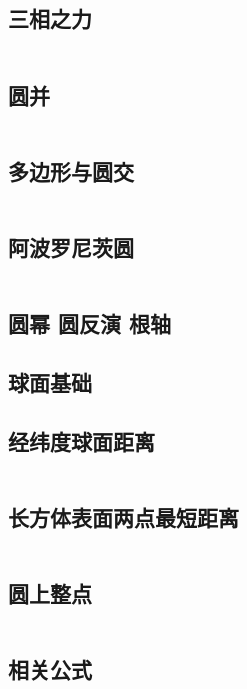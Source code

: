 \documentclass[titlepage, a4paper]{article}
\begin{document}
\begin{multicols}{2}
\begin{spacing}{0.6}
				\subsection{三相之力 \checkmark}
				\inputminted{cpp}{src/Geometry/三角形.cpp}
				\subsection{圆并}
				\inputminted{cpp}{src/Geometry/圆并.cpp}
				\subsection{多边形与圆交}
				\inputminted{cpp}{src/Geometry/多边形和圆的交.cpp}
				\subsection{阿波罗尼茨圆}
				\inputminted{cpp}{src/Geometry/阿波罗尼茨圆.tex}
				\subsection{圆幂 圆反演 根轴}
				
				\subsection{球面基础}
				
				\subsection{经纬度球面距离 \checkmark}
				\inputminted{cpp}{src/Geometry/经纬度求球面最短距离.cpp}
				\subsection{长方体表面两点最短距离}
				\inputminted{cpp}{src/Geometry/长方体表面两点最短距离.cpp}
				\subsection{圆上整点 \checkmark}
				\inputminted{cpp}{src/Geometry/圆上整点.cpp}
				\subsection{相关公式}
				
				\newpage

\end{spacing}
\end{multicols}
\end{document}
